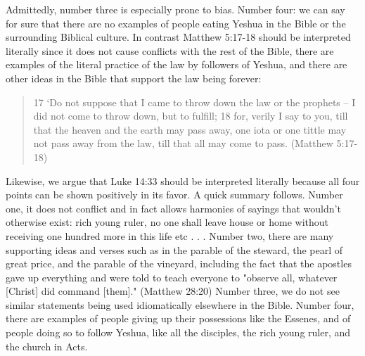 \documentclass[11pt]{article}
\begin{document}
Admittedly, number three is especially prone to bias. Number four: we can say for sure that there are no examples of people eating Yeshua in the Bible or the surrounding Biblical culture. In contrast Matthew 5:17-18 should be interpreted literally since it does not cause conflicts with the rest of the Bible, there are examples of the literal practice of the law by followers of Yeshua, and there are other ideas in the Bible that support the law being forever: 
\begin{quote}
17 `Do not suppose that I came to throw down the law or the prophets -- I did not come to throw down, but to fulfill; 18 for, verily I say to you, till that the heaven and the earth may pass away, one iota or one tittle may not pass away from the law, till that all may come to pass. (Matthew 5:17-18) 
\end{quote}
Likewise, we argue that Luke 14:33 should be interpreted literally because all four points can be shown positively in its favor. A quick summary follows. Number one, it does not conflict and in fact allows harmonies of sayings that wouldn't otherwise exist: rich young ruler, no one shall leave house or home without receiving one hundred more in this life etc . . . Number two, there are many supporting ideas and verses such as in the parable of the steward, the pearl of great price, and the parable of the vineyard, including the fact that the apostles gave up everything and were told to teach everyone to "observe all, whatever [Christ] did command [them]." (Matthew 28:20) Number three, we do not see similar statements being used idiomatically elsewhere in the Bible. Number four, there are examples of people giving up their possessions like the Essenes, and of people doing so to follow Yeshua, like all the disciples, the rich young ruler, and the church in Acts.
\end{document}
